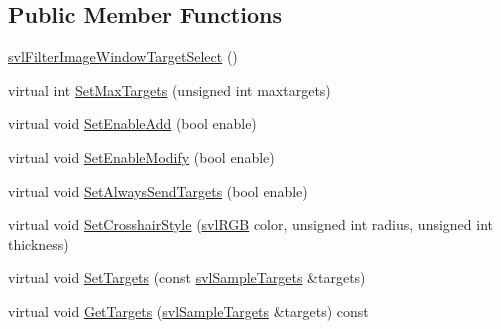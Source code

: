 \subsection*{Public Member Functions}
\begin{DoxyCompactItemize}
\item 
\hyperlink{classsvl_filter_image_window_target_select_aa2295fb4d3c9f3697fc9d598497f3a5c}{svl\+Filter\+Image\+Window\+Target\+Select} ()
\item 
virtual int \hyperlink{classsvl_filter_image_window_target_select_a72ac399ec43e425d5f13ea3da2144761}{Set\+Max\+Targets} (unsigned int maxtargets)
\item 
virtual void \hyperlink{classsvl_filter_image_window_target_select_ab102f6d5bbf71df32086f437e9197807}{Set\+Enable\+Add} (bool enable)
\item 
virtual void \hyperlink{classsvl_filter_image_window_target_select_a281125512b6d6f330879e9d42f10b6fe}{Set\+Enable\+Modify} (bool enable)
\item 
virtual void \hyperlink{classsvl_filter_image_window_target_select_aa709dac3ddbb69d3cfbd9bac688020d6}{Set\+Always\+Send\+Targets} (bool enable)
\item 
virtual void \hyperlink{classsvl_filter_image_window_target_select_a0ede076c6b2d721dd0787b77e391865b}{Set\+Crosshair\+Style} (\hyperlink{structsvl_r_g_b}{svl\+R\+G\+B} color, unsigned int radius, unsigned int thickness)
\item 
virtual void \hyperlink{classsvl_filter_image_window_target_select_ac434a5acfc98a39fde05e85daeacef59}{Set\+Targets} (const \hyperlink{classsvl_sample_targets}{svl\+Sample\+Targets} \&targets)
\item 
virtual void \hyperlink{classsvl_filter_image_window_target_select_aa207e577772171edfcda4eddad918c7c}{Get\+Targets} (\hyperlink{classsvl_sample_targets}{svl\+Sample\+Targets} \&targets) const 
\end{DoxyCompactItemize}
